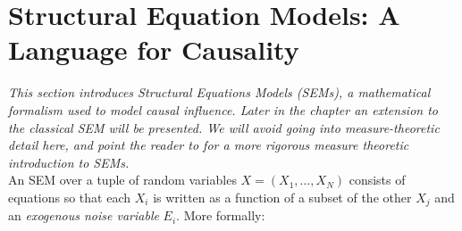 






\section{Structural Equation Models: A Language for Causality}

\emph{This section introduces Structural Equations Models (SEMs), a mathematical formalism used to model causal influence. Later in the chapter an extension to the classical SEM will be presented.
We will avoid going into measure-theoretic detail here, and point the reader to \cite{bongers2016structural} for a more rigorous measure theoretic introduction to SEMs.}
\\

\noindent An SEM over a tuple of random variables $X = (X_1, \ldots, X_N)$ consists of equations so that each $X_i$ is written as a function of a subset of the other $X_j$ and an \emph{exogenous noise variable} $E_i$. More formally:

\medskip

